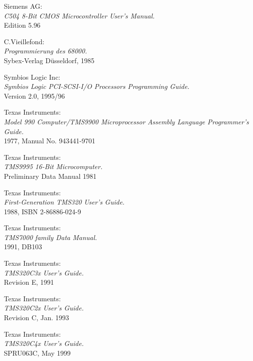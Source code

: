  Siemens AG: \\
                  {\em C504 8-Bit CMOS Microcontroller User's Manual.\/} \\
                  Edition 5.96

 C.Vieillefond: \\
                 {\em Programmierung des 68000.\/} \\
                 Sybex-Verlag D\"usseldorf, 1985

 Symbios Logic Inc: \\
                 {\em Symbios Logic PCI-SCSI-I/O Processors Programming   
                 Guide.\/} \\
                 Version 2.0, 1995/96
                 
  Texas Instruments: \\
                 {\em Model 990 Computer/TMS9900 Microprocessor
                      Assembly Language Programmer's Guide.\/} \\
                 1977, Manual No. 943441-9701

 Texas Instruments: \\
                 {\em TMS9995 16-Bit Microcomputer.\/} \\
                 Preliminary Data Manual
                 1981

 Texas Instruments: \\
                {\em First-Generation TMS320 User's Guide.\/} \\
                1988, ISBN 2-86886-024-9

 Texas Instruments: \\
                 {\em TMS7000 family Data Manual.\/} \\
                 1991, DB103

 Texas Instruments: \\
                {\em TMS320C3x User's Guide.\/} \\
                Revision E, 1991

 Texas Instruments: \\
                {\em TMS320C2x User's Guide.\/} \\
                Revision C, Jan. 1993

 Texas Instruments: \\
                   {\em TMS320C4x User's Guide.\/} \\
                   SPRU063C, May 1999

